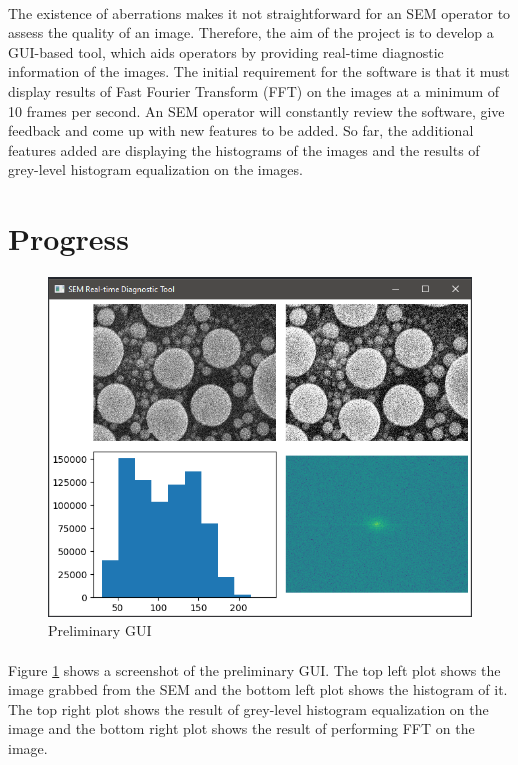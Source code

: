 \documentclass[12pt,a4paper]{article}
\begin{document}
\paragraph{}
The existence of aberrations makes it not straightforward for an SEM operator to assess the quality of an image. Therefore, the aim of the project is to develop a GUI-based tool, which aids operators by providing real-time diagnostic information of the images. The initial requirement for the software is that it must display results of Fast Fourier Transform (FFT) on the images at a minimum of 10 frames per second. An SEM operator will constantly review the software, give feedback and come up with new features to be added. So far, the additional features added are displaying the histograms of the images and the results of grey-level histogram equalization on the images.

\section{Progress}
\begin{figure}[h!]
  \centering
  \includegraphics[scale=0.8]{"GUI"}
  \caption{Preliminary GUI}
  \label{fig:GUI}
\end{figure}

\paragraph{}
Figure \ref{fig:GUI} shows a screenshot of the preliminary GUI. The top left plot shows the image grabbed from the SEM and the bottom left plot shows the histogram of it. The top right plot shows the result of grey-level histogram equalization \cite{torywalker} on the image and the bottom right plot shows the result of performing FFT on the image.
\end{document}
